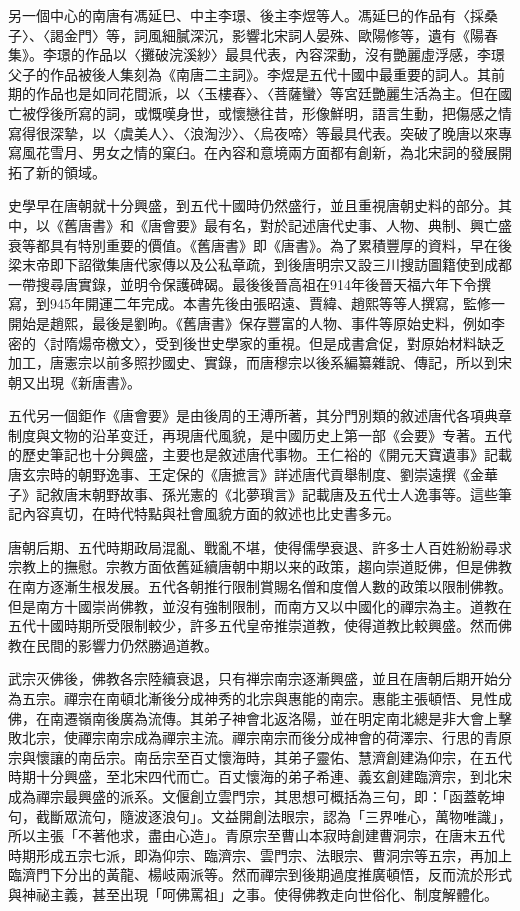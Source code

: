 另一個中心的南唐有馮延巳、中主李璟、後主李煜等人。馮延巳的作品有〈採桑子〉、〈謁金門〉等，詞風細膩深沉，影響北宋詞人晏殊、歐陽修等，遺有《陽春集》。李璟的作品以〈攤破浣溪紗〉最具代表，內容深動，沒有艷麗虛浮感，李璟父子的作品被後人集刻為《南唐二主詞》。李煜是五代十國中最重要的詞人。其前期的作品也是如同花間派，以〈玉樓春〉、〈菩薩蠻〉等宮廷艷麗生活為主。但在國亡被俘後所寫的詞，或慨嘆身世，或懷戀往昔，形像鮮明，語言生動，把傷感之情寫得很深摯，以〈虞美人〉、〈浪淘沙〉、〈烏夜啼〉等最具代表。突破了晚唐以來專寫風花雪月、男女之情的窠臼。在內容和意境兩方面都有創新，為北宋詞的發展開拓了新的領域。

史學早在唐朝就十分興盛，到五代十國時仍然盛行，並且重視唐朝史料的部分。其中，以《舊唐書》和《唐會要》最有名，對於記述唐代史事、人物、典制、興亡盛衰等都具有特別重要的價值。《舊唐書》即《唐書》。為了累積豐厚的資料，早在後梁末帝即下詔徵集唐代家傳以及公私章疏，到後唐明宗又設三川搜訪圖籍使到成都一帶搜尋唐實錄，並明令保護碑碣。最後後晉高祖在914年後晉天福六年下令撰寫，到945年開運二年完成。本書先後由張昭遠、賈緯、趙熙等等人撰寫，監修一開始是趙熙，最後是劉昫。《舊唐書》保存豐富的人物、事件等原始史料，例如李密的〈討隋煬帝檄文〉，受到後世史學家的重視。但是成書倉促，對原始材料缺乏加工，唐憲宗以前多照抄國史、實錄，而唐穆宗以後系編纂雜說、傳記，所以到宋朝又出現《新唐書》。

五代另一個鉅作《唐會要》是由後周的王溥所著，其分門別類的敘述唐代各項典章制度與文物的沿革变迁，再現唐代風貌，是中國历史上第一部《会要》专著。五代的歷史筆記也十分興盛，主要也是敘述唐代事物。王仁裕的《開元天寶遺事》記載唐玄宗時的朝野逸事、王定保的《唐摭言》詳述唐代貢舉制度、劉崇遠撰《金華子》記敘唐末朝野故事、孫光憲的《北夢瑣言》記載唐及五代士人逸事等。這些筆記內容真切，在時代特點與社會風貌方面的敘述也比史書多元。

唐朝后期、五代時期政局混亂、戰亂不堪，使得儒學衰退、許多士人百姓紛紛尋求宗教上的撫慰。宗教方面依舊延續唐朝中期以来的政策，趨向崇道貶佛，但是佛教在南方逐漸生根发展。五代各朝推行限制賞賜名僧和度僧人數的政策以限制佛教。但是南方十國崇尚佛教，並沒有強制限制，而南方又以中國化的禪宗為主。道教在五代十國時期所受限制較少，許多五代皇帝推崇道教，使得道教比較興盛。然而佛教在民間的影響力仍然勝過道教。

武宗灭佛後，佛教各宗陸續衰退，只有禅宗南宗逐漸興盛，並且在唐朝后期开始分為五宗。禪宗在南頓北漸後分成神秀的北宗與惠能的南宗。惠能主張頓悟、見性成佛，在南遷嶺南後廣為流傳。其弟子神會北返洛陽，並在明定南北總是非大會上擊敗北宗，使禪宗南宗成為禪宗主流。禪宗南宗而後分成神會的荷澤宗、行思的青原宗與懷讓的南岳宗。南岳宗至百丈懷海時，其弟子靈佑、慧濟創建溈仰宗，在五代時期十分興盛，至北宋四代而亡。百丈懷海的弟子希連、義玄創建臨濟宗，到北宋成為禪宗最興盛的派系。文偃創立雲門宗，其思想可概括為三句，即：「函蓋乾坤句，截斷眾流句，隨波逐浪句」。文益開創法眼宗，認為「三界唯心，萬物唯識」，所以主張「不著他求，盡由心造」。青原宗至曹山本寂時創建曹洞宗，在唐末五代時期形成五宗七派，即溈仰宗、臨濟宗、雲門宗、法眼宗、曹洞宗等五宗，再加上臨濟門下分出的黃龍、楊岐兩派等。然而禪宗到後期過度推廣頓悟，反而流於形式與神祕主義，甚至出現「呵佛罵祖」之事。使得佛教走向世俗化、制度解體化。

